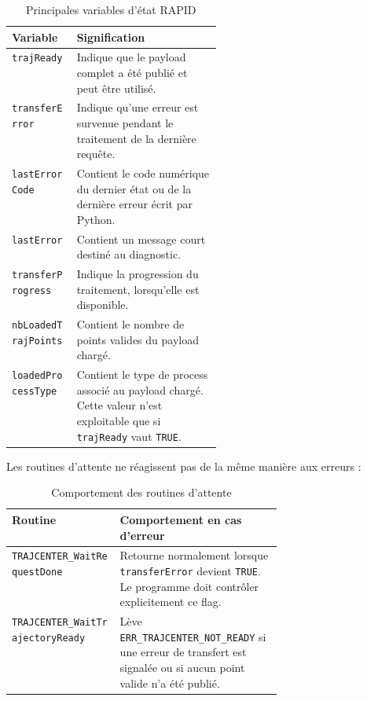\documentclass{rapportENSAM}
\begin{document}
\begin{table}[ht]
    \centering
    \begin{tabularx}{\linewidth}{
        |p{0.31\linewidth}
        |X|
    }
        \hline
        \textbf{Variable} &
        \textbf{Signification} \\
        \hline

        \texttt{trajReady} &
        Indique que le payload complet a été publié et peut être utilisé. \\
        \hline

        \texttt{transferError} &
        Indique qu'une erreur est survenue pendant le traitement de la dernière
        requête. \\
        \hline

        \texttt{lastErrorCode} &
        Contient le code numérique du dernier état ou de la dernière erreur
        écrit par Python. \\
        \hline

        \texttt{lastError} &
        Contient un message court destiné au diagnostic. \\
        \hline

        \texttt{transferProgress} &
        Indique la progression du traitement, lorsqu'elle est disponible. \\
        \hline

        \texttt{nbLoadedTrajPoints} &
        Contient le nombre de points valides du payload chargé. \\
        \hline

        \texttt{loadedProcessType} &
        Contient le type de process associé au payload chargé. Cette valeur
        n'est exploitable que si \texttt{trajReady} vaut \texttt{TRUE}. \\
        \hline
    \end{tabularx}
    \caption{Principales variables d'état RAPID}
    \label{tab:rapid-transfer-state-variables}
\end{table}

Les routines d'attente ne réagissent pas de la même manière aux erreurs :

\begin{table}[ht]
    \centering
    \begin{tabularx}{\linewidth}{
        |p{0.40\linewidth}
        |X|
    }
        \hline
        \textbf{Routine} &
        \textbf{Comportement en cas d'erreur} \\
        \hline

        \texttt{TRAJCENTER\_WaitRequestDone} &
        Retourne normalement lorsque \texttt{transferError} devient
        \texttt{TRUE}. Le programme doit contrôler explicitement ce flag. \\
        \hline

        \texttt{TRAJCENTER\_WaitTrajectoryReady} &
        Lève \texttt{ERR\_TRAJCENTER\_NOT\_READY} si une erreur de transfert
        est signalée ou si aucun point valide n'a été publié. \\
        \hline
    \end{tabularx}
    \caption{Comportement des routines d'attente}
    \label{tab:rapid-wait-behaviour}
\end{table}
\end{document}
